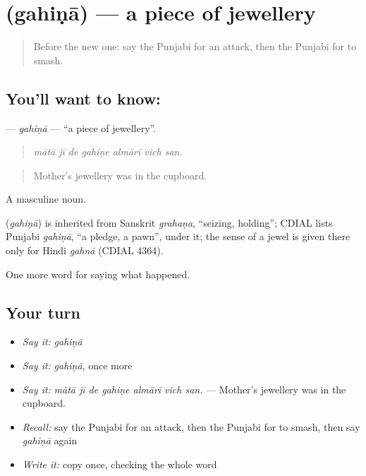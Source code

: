 \section[\texorpdfstring{\pa{ਗਹਿਣਾ} (gahiṇā)}{ਗਹਿਣਾ (gahiṇā)}]{ (gahiṇā) — a piece of jewellery}

\label{lesson:PA-C315-gahina}



\begin{quote}
Before the new one: say the Punjabi for an attack, then the Punjabi for to smash.
\end{quote}

\subsection*{You'll want to know: }
\textbf{} — \emph{gahiṇā} — \textquotedblleft{}a piece of jewellery\textquotedblright{}.

\begin{quote}
      
\end{quote}

\begin{quote}
\emph{mātā jī de gahiṇe almārī vich san.}
\end{quote}

\begin{quote}
Mother's jewellery was in the cupboard.
\end{quote}

A masculine noun.

\begin{cousinweb}
\textbf{} (\emph{gahiṇā}) is inherited from Sanskrit \emph{grahaṇa}, \textquotedblleft{}seizing, holding\textquotedblright{}; CDIAL lists Punjabi \emph{gahiṇā}, \textquotedblleft{}a pledge, a pawn\textquotedblright{}, under it; the sense of a jewel is given there only for Hindi \emph{gahnā} (CDIAL 4364).
\end{cousinweb}

\begin{grammarlens}[title={What you've built}]
One more word for saying what happened.
\end{grammarlens}

\subsection*{Your turn}
\begin{itemize}
\raggedright
  \item \emph{Say it:} \emph{gahiṇā}
  \item \emph{Say it:} \emph{gahiṇā}, once more
  \item \emph{Say it:} \emph{mātā jī de gahiṇe almārī vich san.} — Mother's jewellery was in the cupboard.
  \item \emph{Recall:} say the Punjabi for an attack, then the Punjabi for to smash, then say \emph{gahiṇā} again
  \item \emph{Write it:} copy \textbf{} once, checking the whole word
\end{itemize}

